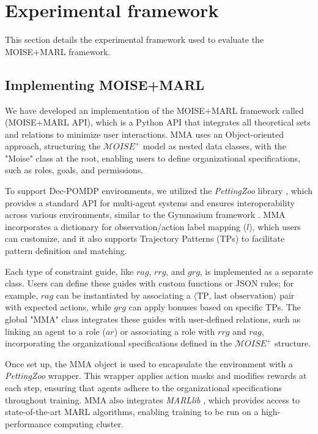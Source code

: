 \documentclass[sigconf]{aamas}
\begin{document}
\section{Experimental framework}
\label{sec:experimental_setup}

This section details the experimental framework used to evaluate the MOISE+MARL framework.%

\subsection{Implementing MOISE+MARL}

We have developed an implementation of the MOISE+MARL framework called ~\hyperref[fn:github]{\footnotemark[1]} (MOISE+MARL API), which is a Python API that integrates all theoretical sets and relations to minimize user interactions. MMA uses an Object-oriented approach, structuring the $\mathcal{M}OISE^+$ model as nested data classes, with the "Moise" class at the root, enabling users to define organizational specifications, such as roles, goals, and permissions.

To support Dec-POMDP environments, we utilized the \textit{PettingZoo} library \cite{terry2020pettingzoo}, which provides a standard API for multi-agent systems and ensures interoperability across various environments, similar to the Gymnasium framework \cite{kwiatkowski2024}. MMA incorporates a dictionary for observation/action label mapping ($l$), which users can customize, and it also supports Trajectory Patterns (TPs) to facilitate pattern definition and matching.

Each type of constraint guide, like $rag$, $rrg$, and $grg$, is implemented as a separate class. Users can define these guides with custom functions or JSON rules; for example, $rag$ can be instantiated by associating a $\langle \text{TP, last observation} \rangle$ pair with expected actions, while $grg$ can apply bonuses based on specific TPs. The global "MMA" class integrates these guides with user-defined relations, such as linking an agent to a role ($ar$) or associating a role with $rrg$ and $rag$, incorporating the organizational specifications defined in the $\mathcal{M}OISE^+$ structure.

Once set up, the MMA object is used to encapsulate the environment with a \textit{PettingZoo} wrapper. This wrapper applies action masks and modifies rewards at each step, ensuring that agents adhere to the organizational specifications throughout training. MMA also integrates \textit{MARLlib} \cite{hu2021marlib}, which provides access to state-of-the-art MARL algorithms, enabling training to be run on a high-performance computing cluster.
\end{document}
